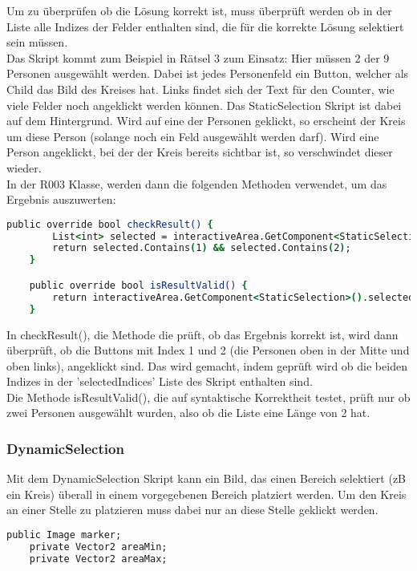 {Um zu überprüfen ob die Lösung korrekt ist, muss überprüft werden ob in der Liste alle Indizes der Felder enthalten sind, die für die korrekte Lösung selektiert sein müssen.\\

Das Skript kommt zum Beispiel in Rätsel 3 zum Einsatz:
Hier müssen 2 der 9 Personen ausgewählt werden. Dabei ist jedes Personenfeld ein Button, welcher als Child das Bild des Kreises hat. Links findet sich der Text für den Counter, wie viele Felder noch angeklickt werden können. Das StaticSelection Skript ist dabei auf dem Hintergrund. Wird auf eine der Personen geklickt, so erscheint der Kreis um diese Person (solange noch ein Feld ausgewählt werden darf). Wird eine Person angeklickt, bei der der Kreis bereits sichtbar ist, so verschwindet dieser wieder.\\
In der R003 Klasse, werden dann die folgenden Methoden verwendet, um das Ergebnis auszuwerten:
\begin{lstlisting}[language=csh, caption={Methoden in der Klasse von Rätsel 3}]
public override bool checkResult() {
        List<int> selected = interactiveArea.GetComponent<StaticSelection>().selectedIndices;
        return selected.Contains(1) && selected.Contains(2);
    }

    public override bool isResultValid() {
        return interactiveArea.GetComponent<StaticSelection>().selectedIndices.Count == 2;
    }
\end{lstlisting}
In checkResult(), die Methode die prüft, ob das Ergebnis korrekt ist, wird dann überprüft, ob die Buttons mit Index 1 und 2 (die Personen oben in der Mitte und oben links), angeklickt sind. Das wird gemacht, indem geprüft wird ob die beiden Indizes in der 'selectedIndices' Liste des Skript enthalten sind.\\
Die Methode isResultValid(), die auf syntaktische Korrektheit testet, prüft nur ob zwei Personen ausgewählt wurden, also ob die Liste eine Länge von 2 hat.

\subsubsection{DynamicSelection}
Mit dem DynamicSelection Skript kann ein Bild, das einen Bereich selektiert (zB ein Kreis) überall in einem vorgegebenen Bereich platziert werden. Um den Kreis an einer Stelle zu platzieren muss dabei nur an diese Stelle geklickt werden.
\begin{lstlisting}[language=csh, caption={DynamicSelection Skript}]
    public Image marker;
    private Vector2 areaMin;
    private Vector2 areaMax;


\end{lstlisting}}
